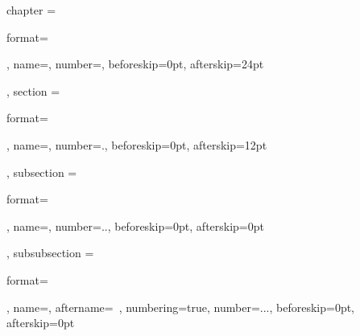 \ctexset
{
    chapter =
        {
            format=\raggedright{}\heiti,
            name={},
            number=,
            beforeskip=0pt,
            afterskip=24pt
        },
    section =
        {
            format=\raggedright\heiti{},
            name={},
            number=.,
            beforeskip=0pt,
            afterskip=12pt
        },
    subsection =
        {
            format=\raggedright\heiti{},
            name={},
            number=..,
            beforeskip=0pt,
            afterskip=0pt
        },
    subsubsection =
        {
            format=\raggedright\heiti{},
            name={},
            aftername=~,
            numbering=true,
            number=...,
            beforeskip=0pt,
            afterskip=0pt
        }
}
